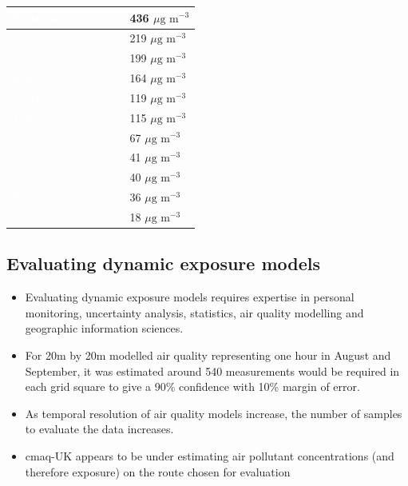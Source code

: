 \begin{table}[H]
\centering
    \begin{tabular}{ | l | l |} \hline
     \cellcolor{victoria} \textcolor{white}{Victoria}                      & 436 $\mu \text{g m}^{-3}$   \\ \hline
     \cellcolor{northern} \textcolor{white}{Northern}                      & 219 $\mu \text{g m}^{-3}$   \\ \hline
     \cellcolor{piccadilly} \textcolor{white}{Piccadilly}                  & 199 $\mu \text{g m}^{-3}$   \\ \hline
     \cellcolor{bakerloo} \textcolor{white}{Bakerloo}                      & 164 $\mu \text{g m}^{-3}$   \\ \hline
     \cellcolor{central} \textcolor{white}{Central}                        & 119 $\mu \text{g m}^{-3}$   \\ \hline
     \cellcolor{jubilee} \textcolor{white}{Jubilee}                        & 115 $\mu \text{g m}^{-3}$   \\ \hline
     \cellcolor{metropolitan} \textcolor{white}{Metropolitan }             & 67 $\mu \text{g m}^{-3}$    \\ \hline
     \cellcolor{circle} \textcolor{white}{Circle}                          & 41 $\mu \text{g m}^{-3}$    \\ \hline
     \cellcolor{district} \textcolor{white}{District}                      & 40 $\mu \text{g m}^{-3}$    \\ \hline
     \cellcolor{hammersmithcity} \textcolor{white}{Hammersmith \& City}    & 36 $\mu \text{g m}^{-3}$    \\ \hline
     \cellcolor{dlr} \textcolor{white}{DLR}                                & 18 $\mu \text{g m}^{-3}$    \\ \hline
    \end{tabular}
\label{tab:london_underground_air_quality}
\end{table}

\subsection{Evaluating dynamic exposure models}
\label{subsec:wrapup_conc_evaluation}

\begin{itemize}
    \item Evaluating dynamic exposure models requires expertise in personal monitoring, uncertainty analysis, statistics, air quality modelling and geographic information sciences.
    \item For 20m by 20m modelled air quality representing one hour in August and September, it was estimated around 540 measurements would be required in each grid square to give a 90\% confidence with 10\% margin of error.
    \item As temporal resolution of air quality models increase, the number of samples to evaluate the data increases.
    \item \gls{cmaq}-UK appears to be under estimating air pollutant concentrations (and therefore exposure) on the route chosen for evaluation
\end{itemize}


